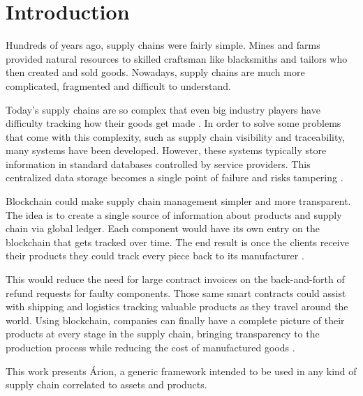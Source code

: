 \section{Introduction} \label{sec:Introduction}

Hundreds of years ago, supply chains were fairly simple. Mines and farms provided natural resources to skilled craftsman like blacksmiths and tailors who then created and sold goods. Nowadays, supply chains are much more complicated, fragmented and difficult to understand. 

Today's supply chains are so complex that even big industry players have difficulty tracking how their goods get made \cite{swan2015blockchain}. In order to solve some problems that come with this complexity, such as supply chain visibility and traceability, many systems have been developed. However, these systems typically store information in standard databases controlled by service providers. This centralized data storage becomes a single point of failure and risks tampering \cite{tian2017supply}.

Blockchain could make supply chain management simpler and more transparent. The idea is to create a single source of information about products and supply chain via global ledger. Each component would have its own entry on the blockchain that gets tracked over time. The end result is once the clients receive their products they could track every piece back to its manufacturer \cite{greve2018blockchain}.

This would reduce the need for large contract invoices on the back-and-forth of refund requests for faulty components. Those same smart contracts could assist with shipping and logistics tracking valuable products as they travel around the world. Using blockchain, companies can finally have a complete picture of their products at every stage in the supply chain, bringing transparency to the production process while reducing the cost of manufactured goods \cite{swan2015blockchain}.

This work presents Árion, a generic framework intended to be used in any kind of supply chain correlated to assets and products.